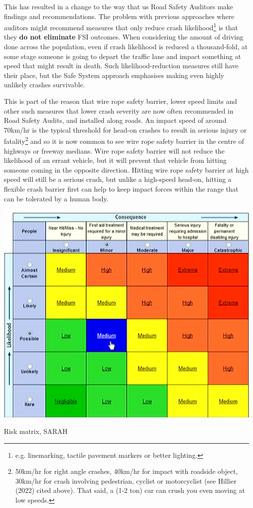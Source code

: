 \documentclass{tufte-handout}
\begin{document}
This has resulted in a change to the way that us Road Safety Auditors make findings and recommendations. The problem with previous approaches where auditors might recommend measures that only reduce crash likelihood\footnote{e.g. linemarking, tactile pavement markers or better lighting.} is that they \textbf{do not eliminate} FSI outcomes. When considering the amount of driving done across the population, even if crash likelihood is reduced a thousand-fold, at some stage someone is going to depart the traffic lane and impact something at speed that might result in death. Such likelihood-reduction measures still have their place, but the Safe System approach emphasises making even highly unlikely crashes survivable. 

This is part of the reason that wire rope safety barrier, lower speed limits and other such measures that lower crash severity are now often recommended in Road Safety Audits, and installed along roads. An impact speed of around 70km/hr is the typical threshold for head-on crashes to result in serious injury or fatality\footnote{50km/hr for right angle crashes, 40km/hr for impact with roadside object, 30km/hr for crash involving pedestrian, cyclist or motorcyclist (see Hillier (2022) cited above). That said, a (1-2 ton) car can crush you even moving at low speeds.} and so it is now common to see wire rope safety barrier in the centre of highways or freeway medians.  Wire rope safety barrier will not reduce the likelihood of an errant vehicle, but it will prevent that vehicle from hitting someone coming in the opposite direction. Hitting wire rope safety barrier at high speed will still be a serious crash, but unlike a high-speed head-on, hitting a flexible crash barrier first can help to keep impact forces within the range that can be tolerated by a human body\cite{TAC:2016aa}.  

\begin{marginfigure}
\includegraphics{SARAH_risk_matrix}
\caption{Risk matrix, SARAH}
\label{fig:SARAH}
\end{marginfigure}
\end{document}
